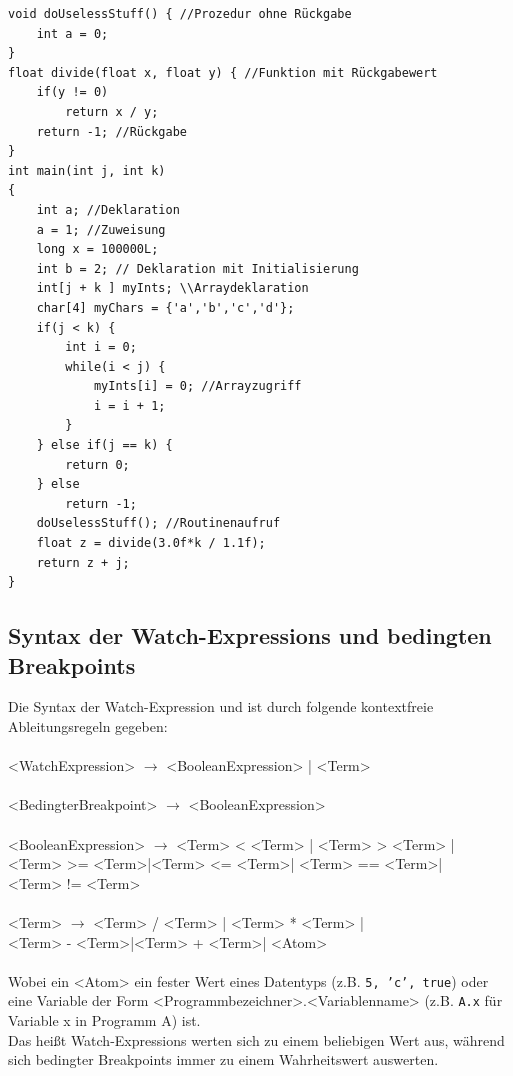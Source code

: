 \documentclass[parskip=full]{scrartcl}
\let\glsplgen\glsuseri
\begin{document}
\begin{verbatim}
void doUselessStuff() { //Prozedur ohne Rückgabe
    int a = 0;
}
float divide(float x, float y) { //Funktion mit Rückgabewert
    if(y != 0)	
        return x / y;
    return -1; //Rückgabe
}
int main(int j, int k)
{
    int a; //Deklaration
    a = 1; //Zuweisung
    long x = 100000L; 
    int b = 2; // Deklaration mit Initialisierung
    int[j + k ] myInts; \\Arraydeklaration
    char[4] myChars = {'a','b','c','d'};
    if(j < k) {
        int i = 0;
        while(i < j) {
            myInts[i] = 0; //Arrayzugriff
            i = i + 1;
        }	
    } else if(j == k) {
        return 0;
    } else
        return -1;
    doUselessStuff(); //Routinenaufruf
    float z = divide(3.0f*k / 1.1f);
    return z + j;
}
\end{verbatim}
\newpage
\subsection{Syntax der Watch-Expressions und bedingten Breakpoints}
Die Syntax der \gls{Watch-Expression} und \glsplgen{bedingter Breakpoint} ist durch folgende kontextfreie Ableitungsregeln gegeben: \\\\
<WatchExpression> $\rightarrow$ <BooleanExpression> | <Term>\\\\
<BedingterBreakpoint> $\rightarrow$ <BooleanExpression>\\\\<BooleanExpression> $\rightarrow$ <Term> < <Term> 
| <Term> > <Term> |\\ <Term> >= <Term>|<Term> <= <Term>| <Term> == <Term>| \\<Term> != <Term>\\\\
<Term> $\rightarrow$ <Term> / <Term> 
| <Term> * <Term> |\\ <Term> - <Term>|<Term> + <Term>| <Atom>\\\\

Wobei ein <Atom> ein fester Wert eines Datentyps (z.B. \texttt{5, 'c', true}) oder eine Variable der Form <Programmbezeichner>.<Variablenname> (z.B. \texttt{A.x} für Variable x in Programm A) ist. \\
Das heißt \glspl{Watch-Expression} werten sich zu einem beliebigen Wert aus, während sich \glspl{bedingter Breakpoint} immer zu einem Wahrheitswert auswerten.


\newpage
\printglossary[style=altlist, toctitle=Glossar]
\end{document}
